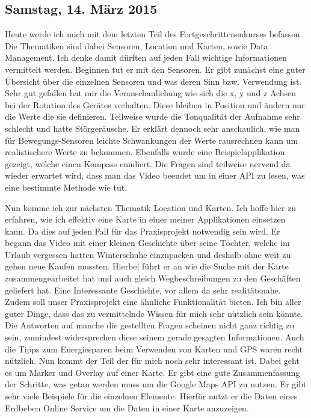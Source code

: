 \documentclass[12pt,a4paper,bibliography=totocnumbered,listof=totocnumbered]{scrartcl}
\begin{document}
\subsection{Samstag, 14. März 2015}

Heute werde ich mich mit dem letzten Teil des Fortgeschrittenenkurses befassen. 
Die Thematiken sind dabei Sensoren, Location und Karten, sowie Data Management. Ich denke damit dürften auf jeden Fall wichtige Informationen vermittelt werden. Beginnen tut er mit den Sensoren. Er gibt zunächst eine guter Übersicht über die einzelnen Sensoren und was deren Sinn bzw. Verwendung ist. Sehr gut gefallen hat mir die Veranschaulichung wie sich die x, y und z Achsen bei der Rotation des Gerätes verhalten. Diese bleiben in Position und ändern nur die Werte die sie definieren. Teilweise wurde die Tonqualität der Aufnahme sehr schlecht und hatte Störgeräusche. Er erklärt dennoch sehr anschaulich, wie man für Bewegungs-Sensoren leichte Schwankungen der Werte rausrechnen kann um realistischere Werte zu bekommen. Ebenfalls wurde eine Beispielapplikation gezeigt, welche einen Kompass emuliert. Die Fragen sind teilweise nervend da wieder erwartet wird, dass man das Video beendet um in einer API zu lesen, was eine bestimmte Methode wie tut. 

Nun komme ich zur nächsten Thematik Location und Karten. Ich hoffe hier zu erfahren, wie ich effektiv eine Karte in einer meiner Applikationen einsetzen kann. Da dies auf jeden Fall für das Praxisprojekt notwendig sein wird. 
Er begann das Video mit einer kleinen Geschichte über seine Töchter, welche im Urlaub vergessen hatten Winterschuhe einzupacken und deshalb ohne weit zu gehen neue Kaufen mussten. Hierbei führt er an wie die Suche mit der Karte zusammengearbeitet hat und auch gleich Wegbeschreibungen zu den Geschäften geliefert hat. 
Eine Interessante Geschichte, vor allem da sehr realitätsnahe. Zudem soll unser Praxisprojekt eine ähnliche Funktionalität bieten. Ich bin aller guter Dinge, dass das zu vermittelnde Wissen für mich sehr nützlich sein könnte. 
Die Antworten auf manche die gestellten Fragen scheinen nicht ganz richtig zu sein, zumindest widersprechen diese seinem gerade gesagten Informationen. Auch die Tipps zum Energiesparen beim Verwenden von Karten und GPS waren recht nützlich. 
Nun kommt der Teil der für mich noch sehr interessant ist. Dabei geht es um Marker und Overlay auf einer Karte. Er gibt eine gute Zusammenfassung der Schritte, was getan werden muss um die Google Maps API zu nutzen. Er gibt sehr viele Beispiele für die einzelnen Elemente. Hierfür nutzt er die Daten eines Erdbeben Online Service um die Daten in einer Karte anzuzeigen. 
\end{document}

